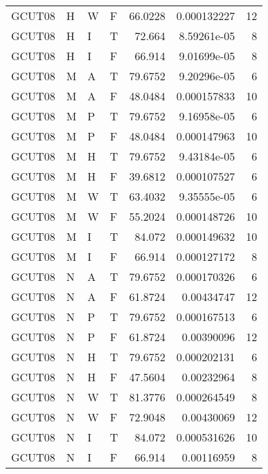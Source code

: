 \begin{table}[!htb]
{\begin{tabular}{llllrrr}
            GCUT08   & H     & W     & F          & 66.0228    & 0.000132227 & 12       \\
            GCUT08   & H     & I     & T          & 72.664     & 8.59261e-05 & 8        \\
            GCUT08   & H     & I     & F          & 66.914     & 9.01699e-05 & 8        \\
            GCUT08   & M     & A     & T          & 79.6752    & 9.20296e-05 & 6        \\
            GCUT08   & M     & A     & F          & 48.0484    & 0.000157833 & 10       \\
            GCUT08   & M     & P     & T          & 79.6752    & 9.16958e-05 & 6        \\
            GCUT08   & M     & P     & F          & 48.0484    & 0.000147963 & 10       \\
            GCUT08   & M     & H     & T          & 79.6752    & 9.43184e-05 & 6        \\
            GCUT08   & M     & H     & F          & 39.6812    & 0.000107527 & 6        \\
            GCUT08   & M     & W     & T          & 63.4032    & 9.35555e-05 & 6        \\
            GCUT08   & M     & W     & F          & 55.2024    & 0.000148726 & 10       \\
            GCUT08   & M     & I     & T          & 84.072     & 0.000149632 & 10       \\
            GCUT08   & M     & I     & F          & 66.914     & 0.000127172 & 8        \\
            GCUT08   & N     & A     & T          & 79.6752    & 0.000170326 & 6        \\
            GCUT08   & N     & A     & F          & 61.8724    & 0.00434747  & 12       \\
            GCUT08   & N     & P     & T          & 79.6752    & 0.000167513 & 6        \\
            GCUT08   & N     & P     & F          & 61.8724    & 0.00390096  & 12       \\
            GCUT08   & N     & H     & T          & 79.6752    & 0.000202131 & 6        \\
            GCUT08   & N     & H     & F          & 47.5604    & 0.00232964  & 8        \\
            GCUT08   & N     & W     & T          & 81.3776    & 0.000264549 & 8        \\
            GCUT08   & N     & W     & F          & 72.9048    & 0.00430069  & 12       \\
            GCUT08   & N     & I     & T          & 84.072     & 0.000531626 & 10       \\
            GCUT08   & N     & I     & F          & 66.914     & 0.00116959  & 8        \\
            \hline
        \end{tabular}
    }{}
\end{table}